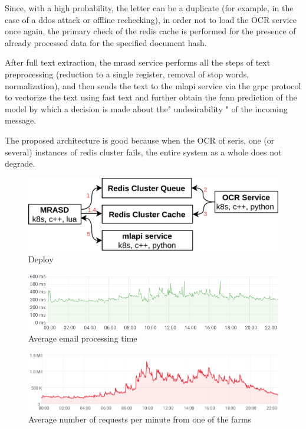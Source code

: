 \documentclass[12pt]{jpconf}
\begin{document}
Since, with a high probability, the letter can be a duplicate (for example, in the case of a ddos attack or offline rechecking), in order not to load the OCR service once again, the primary check of the redis cache is performed for the presence of already processed data for the specified document hash.

After full text extraction, the mrasd service performs all the steps of text preprocessing (reduction to a single register, removal of stop words, normalization), and then sends the text to the mlapi service via the grpc protocol to vectorize the text using fast text and further obtain the fcnn prediction of the model by which a decision is made about the" undesirability " of the incoming message.

The proposed architecture is good because when the OCR of seris, one (or several) instances of redis cluster fails, the entire system as a whole does not degrade.
 
\begin{figure}[h!]
	\center
	\includegraphics[scale=0.25]{images/deploy.jpg}
	\caption{\label{fig:02} Deploy}
\end{figure}


\begin{figure}[h!]
	\center
	\includegraphics[scale=0.6]{images/timings.png}
	\caption{\label{fig:03} Average email processing time}	
\end{figure}


\begin{figure}[h!]
	\center
	\includegraphics[scale=0.5]{images/processed_messages.png}
	\caption{\label{fig:04} Average number of requests per minute from one of the farms}
\end{figure}
\end{document}
